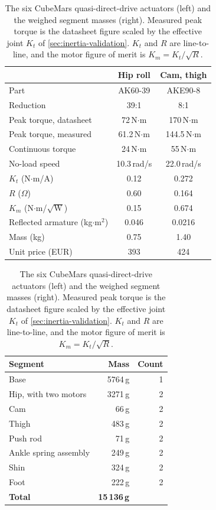 \begin{table}[H]
\centering
\small
\setlength{\tabcolsep}{3.5pt}
\begin{minipage}[t]{0.55\textwidth}
\centering
\begin{tabular}{lcc}
\toprule
& \textbf{Hip roll} & \textbf{Cam, thigh} \\
\midrule
Part & AK60-39 & AKE90-8 \\
Reduction & 39:1 & 8:1 \\
Peak torque, datasheet & 72\,N$\cdot$m & 170\,N$\cdot$m \\
Peak torque, measured & 61.2\,N$\cdot$m & 144.5\,N$\cdot$m \\
Continuous torque & 24\,N$\cdot$m & 55\,N$\cdot$m \\
No-load speed & 10.3\,rad/s & 22.0\,rad/s \\
$K_t$ (N$\cdot$m/A) & 0.12 & 0.272 \\
$R$ ($\Omega$) & 0.60 & 0.164 \\
$K_m$ (N$\cdot$m/$\sqrt{\text{W}}$) & 0.15 & 0.674 \\
Reflected armature (kg$\cdot$m$^2$) & 0.046 & 0.0216 \\
Mass (kg) & 0.75 & 1.40 \\
Unit price (EUR) & 393 & 424 \\
\bottomrule
\end{tabular}
\end{minipage}\hfill
\begin{minipage}[t]{0.43\textwidth}
\centering
\begin{tabular}{lrr}
\toprule
\textbf{Segment} & \textbf{Mass} & \textbf{Count} \\
\midrule
Base & 5764\,g & 1 \\
Hip, with two motors & 3271\,g & 2 \\
Cam & 66\,g & 2 \\
Thigh & 483\,g & 2 \\
Push rod & 71\,g & 2 \\
Ankle spring assembly & 249\,g & 2 \\
Shin & 324\,g & 2 \\
Foot & 222\,g & 2 \\
\midrule
\textbf{Total} & \textbf{15\,136\,g} & \\
\bottomrule
\end{tabular}
\end{minipage}
\caption{The six CubeMars quasi-direct-drive actuators (left) and the weighed segment masses
(right). Measured peak torque is the datasheet figure scaled by the effective joint $K_t$ of
\cref{sec:inertia-validation}. $K_t$ and $R$ are line-to-line, and the motor figure of merit is
$K_m = K_t/\sqrt{R}$. }
\label{tab:motors}
\end{table}

